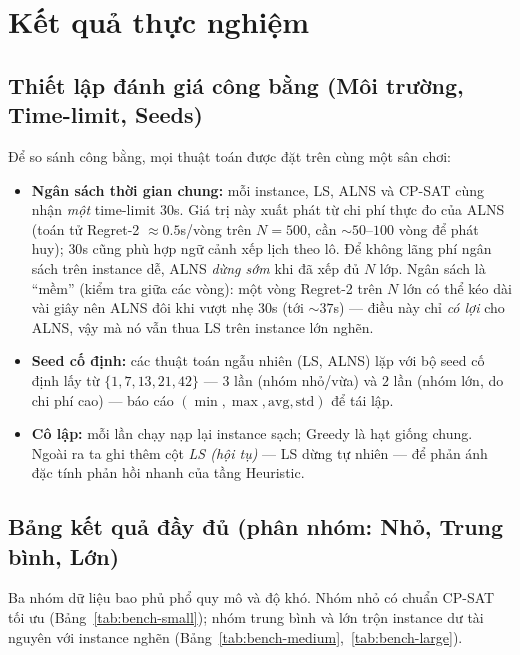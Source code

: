 \section{Kết quả thực nghiệm}
\label{sec:results}

\subsection{Thiết lập đánh giá công bằng (Môi trường, Time-limit, Seeds)}
\label{sec:setup}
Để so sánh công bằng, mọi thuật toán được đặt trên cùng một sân chơi:
\begin{itemize}
  \item \textbf{Ngân sách thời gian chung:} mỗi instance, LS, ALNS và CP-SAT cùng
  nhận \emph{một} time-limit $30$s. Giá trị này xuất phát từ chi phí thực đo của
  ALNS (toán tử Regret-2 $\approx 0.5$s/vòng trên $N{=}500$, cần $\sim 50$--$100$
  vòng để phát huy); $30$s cũng phù hợp ngữ cảnh xếp lịch theo lô. Để không lãng
  phí ngân sách trên instance dễ, ALNS \emph{dừng sớm} khi đã xếp đủ $N$ lớp. Ngân
  sách là ``mềm'' (kiểm tra giữa các vòng): một vòng Regret-2 trên $N$ lớn có thể
  kéo dài vài giây nên ALNS đôi khi vượt nhẹ $30$s (tới $\sim 37$s) --- điều này chỉ
  \emph{có lợi} cho ALNS, vậy mà nó vẫn thua LS trên instance lớn nghẽn.
  \item \textbf{Seed cố định:} các thuật toán ngẫu nhiên (LS, ALNS) lặp với bộ seed
  cố định lấy từ $\{1,7,13,21,42\}$ --- $3$ lần (nhóm nhỏ/vừa) và $2$ lần (nhóm lớn,
  do chi phí cao) --- báo cáo $(\min,\max,\text{avg},\text{std})$ để tái lập.
  \item \textbf{Cô lập:} mỗi lần chạy nạp lại instance sạch; Greedy là hạt giống
  chung. Ngoài ra ta ghi thêm cột \emph{LS (hội tụ)} --- LS dừng tự nhiên --- để
  phản ánh đặc tính phản hồi nhanh của tầng Heuristic.
\end{itemize}



\subsection{Bảng kết quả đầy đủ (phân nhóm: Nhỏ, Trung bình, Lớn)}
\label{sec:tables}
Ba nhóm dữ liệu bao phủ phổ quy mô và độ khó. Nhóm nhỏ có chuẩn CP-SAT tối ưu
(Bảng~\ref{tab:bench-small}); nhóm trung bình và lớn trộn instance dư tài nguyên
với instance nghẽn (Bảng~\ref{tab:bench-medium},~\ref{tab:bench-large}).

